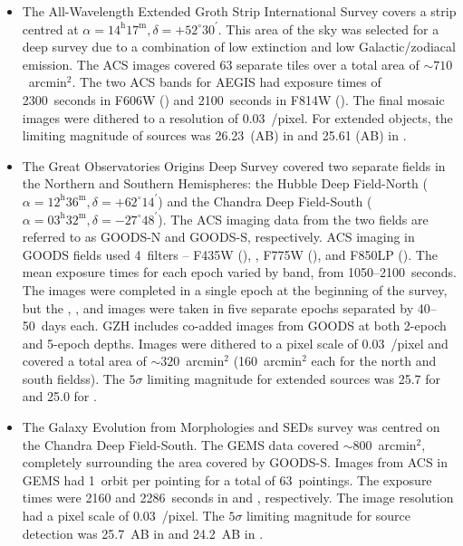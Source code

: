 \documentclass[a4paper,fleqn,usenatbib]{mnras}
\begin{document}
\begin{itemize}

\item The All-Wavelength Extended Groth Strip International Survey
    \citep[AEGIS;][]{dav07} covers a strip centred at
    $\alpha=14^\textrm{h}17^\textrm{m}, \delta=+52^\circ30^\prime$. This area
    of the sky was selected for a deep survey due to a combination of low
    extinction and low Galactic/zodiacal emission. The ACS images covered 63
    separate tiles over a total area of $\sim710$~arcmin$^2$. The two ACS bands
    for AEGIS had exposure times of 2300~seconds in F606W (\Vband) and
    2100~seconds in F814W (\Iband). The final mosaic images were dithered
    to a resolution of 0.03~\arcsec/pixel. For extended objects, the
    limiting magnitude of sources was 26.23~(AB) in \Vband{} and 25.61 (AB) in
    \Iband. 

\item The Great Observatories Origins Deep Survey \citep[GOODS;][]{gia04}
    covered two separate fields in the Northern and Southern Hemispheres: the Hubble
    Deep Field-North ($\alpha=12^\textrm{h}36^\textrm{m},
    \delta=+62^\circ14^\prime$) and the Chandra Deep Field-South
    ($\alpha=03^\textrm{h}32^\textrm{m}, \delta=-27^\circ48^\prime$). The \hst{}
    ACS imaging data from the two fields are referred to as GOODS-N and GOODS-S,
    respectively. ACS imaging in GOODS fields used 4~filters -- F435W (\Bband),
    \Vband, F775W (\iband), and F850LP (\zband). The mean exposure times for each
    epoch varied by band, from 1050--2100~seconds. The \Bband{} images were completed
    in a single epoch at the beginning of the survey, but the \Vband, \iband, and
    \zband{} images were taken in five separate epochs separated by 40--50~days
    each. GZH includes co-added images from GOODS at both 2-epoch and 5-epoch
    depths. Images were dithered to a pixel scale of 0.03~\arcsec/pixel and covered a
    total area of $\sim320$~arcmin$^2$ (160~arcmin$^2$ each for the north and south fieldss). The
    $5\sigma$ limiting magnitude for extended sources was 25.7 for \Vband{} and
    25.0 for \iband. 

\item The Galaxy Evolution from Morphologies and SEDs
    \citep[GEMS;][]{rix04,cal08} survey was centred on the Chandra Deep
    Field-South. The GEMS data covered $\sim800$~arcmin$^2$, completely surrounding
    the area covered by GOODS-S. Images from ACS in GEMS had 1~orbit per pointing
    for a total of 63~pointings. The exposure times were 2160 and 2286~seconds in
    \Vband{} and \zband{}, respectively. The image resolution had a pixel scale
    of 0.03~\arcsec/pixel. The $5\sigma$ limiting magnitude for source
    detection was 25.7~AB in \Vband{} and 24.2~AB in \zband. 


\end{itemize}
\end{document}

